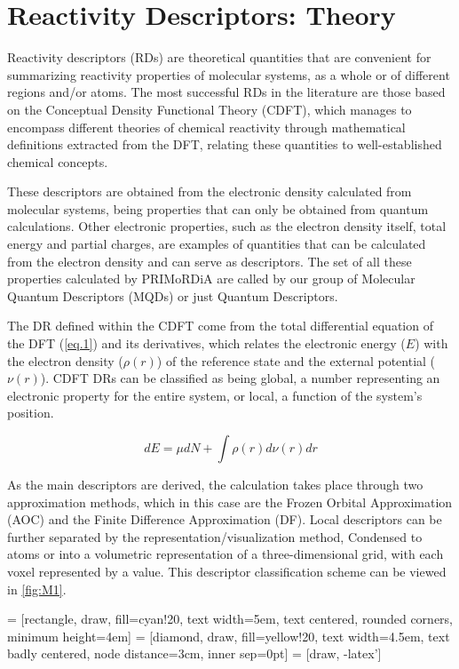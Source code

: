 \documentclass[a4paper,11pt]{refart}
\begin{document}
	\section{Reactivity Descriptors: Theory}

	Reactivity descriptors (RDs) are theoretical quantities that are convenient for summarizing reactivity properties of molecular systems, as a whole or of different regions and/or atoms. The most successful RDs in the literature are those based on the Conceptual Density Functional Theory (CDFT), which manages to encompass different theories of chemical reactivity through mathematical definitions extracted from the DFT, relating these quantities to well-established chemical concepts\cite{geerlings2003conceptual}.

	These descriptors are obtained from the electronic density calculated from molecular systems, being properties that can only be obtained from quantum calculations. Other electronic properties, such as the electron density itself, total energy and partial charges, are examples of quantities that can be calculated from the electron density and can serve as descriptors. The set of all these properties calculated by PRIMoRDiA are called by our group of Molecular Quantum Descriptors (MQDs) or just Quantum Descriptors.

	The DR defined within the CDFT come from the total differential equation of the DFT (\autoref{eq.1}) and its derivatives\cite{parr1978elect}, which relates the electronic energy ($E$) with the electron density ($\rho( r)$) of the reference state and the external potential ($\nu(r)$). CDFT DRs can be classified as being global, a number representing an electronic property for the entire system, or local, a function of the system's position.

	\begin{equation}
	dE = \mu dN + \int \rho(r) d \nu (r) dr
	\label{eq.1}
	\end{equation}

	As the main descriptors are derived, the calculation takes place through two approximation methods, which in this case are the Frozen Orbital Approximation (AOC) and the Finite Difference Approximation (DF). Local descriptors can be further separated by the representation/visualization method, Condensed to atoms or into a volumetric representation of a three-dimensional grid, with each voxel represented by a value. This descriptor classification scheme can be viewed in \autoref{fig:M1}.

	 = [rectangle, draw, fill=cyan!20, 
	text width=5em, text centered, rounded corners, minimum height=4em]
	 = [diamond, draw, fill=yellow!20, 
	text width=4.5em, text badly centered, node distance=3cm, inner sep=0pt]
	 = [draw, -latex']
\end{document}
